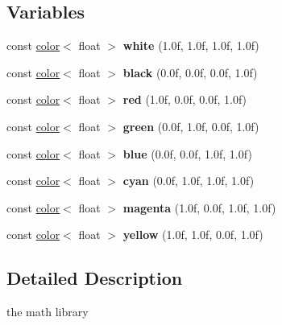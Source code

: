 \subsection*{Variables}
\begin{DoxyCompactItemize}
\item 
\hypertarget{namespacemath_a84acd5f06bd58d3bd80a3ac28ccffcb6}{
const \hyperlink{classmath_1_1color}{color}$<$ float $>$ {\bfseries white} (1.0f, 1.0f, 1.0f, 1.0f)}
\label{namespacemath_a84acd5f06bd58d3bd80a3ac28ccffcb6}

\item 
\hypertarget{namespacemath_a3e135c299976bcb835563f0e7c3dbec4}{
const \hyperlink{classmath_1_1color}{color}$<$ float $>$ {\bfseries black} (0.0f, 0.0f, 0.0f, 1.0f)}
\label{namespacemath_a3e135c299976bcb835563f0e7c3dbec4}

\item 
\hypertarget{namespacemath_a6995bc6fd4ab9e052ff61aa7d395286d}{
const \hyperlink{classmath_1_1color}{color}$<$ float $>$ {\bfseries red} (1.0f, 0.0f, 0.0f, 1.0f)}
\label{namespacemath_a6995bc6fd4ab9e052ff61aa7d395286d}

\item 
\hypertarget{namespacemath_a710cbf5485eebeabedef3625f59de15e}{
const \hyperlink{classmath_1_1color}{color}$<$ float $>$ {\bfseries green} (0.0f, 1.0f, 0.0f, 1.0f)}
\label{namespacemath_a710cbf5485eebeabedef3625f59de15e}

\item 
\hypertarget{namespacemath_ae53a99d95b0282ba5908a751ebf3f152}{
const \hyperlink{classmath_1_1color}{color}$<$ float $>$ {\bfseries blue} (0.0f, 0.0f, 1.0f, 1.0f)}
\label{namespacemath_ae53a99d95b0282ba5908a751ebf3f152}

\item 
\hypertarget{namespacemath_aeccbaee1e6b666726bee89dfa1484146}{
const \hyperlink{classmath_1_1color}{color}$<$ float $>$ {\bfseries cyan} (0.0f, 1.0f, 1.0f, 1.0f)}
\label{namespacemath_aeccbaee1e6b666726bee89dfa1484146}

\item 
\hypertarget{namespacemath_abcc2a4e20082b34127e54bb1a00bd26e}{
const \hyperlink{classmath_1_1color}{color}$<$ float $>$ {\bfseries magenta} (1.0f, 0.0f, 1.0f, 1.0f)}
\label{namespacemath_abcc2a4e20082b34127e54bb1a00bd26e}

\item 
\hypertarget{namespacemath_a34e2266178858c5a5b866d4af7b24b7b}{
const \hyperlink{classmath_1_1color}{color}$<$ float $>$ {\bfseries yellow} (1.0f, 1.0f, 0.0f, 1.0f)}
\label{namespacemath_a34e2266178858c5a5b866d4af7b24b7b}

\end{DoxyCompactItemize}


\subsection{Detailed Description}
the math library 
